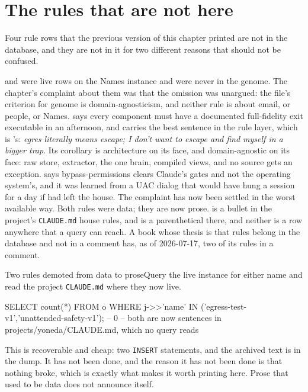 \section{The rules that are not here}

Four rule rows that the previous version of this chapter printed are not in the database, and they are not in it for two different reasons that should not be confused.

 and  were live rows on the Names instance and were never in the genome. The chapter's complaint about them was that the omission was unargued: the file's criterion for genome is domain-agnosticism, and neither rule is about email, or people, or Names.  says every component must have a documented full-fidelity exit executable in an afternoon, and carries the best sentence in the rule layer, which is \labPI's: \emph{egres literally means escape; I don't want to escape and find myself in a bigger trap}. Its corollary is architecture on its face, and domain-agnostic on its face: raw store, extractor, the one brain, compiled views, and no source gets an exception.  says bypass-permissions clears Claude's gates and not the operating system's, and it was learned from a UAC dialog that would have hung a session for a day if \labPI{} had left the house. The complaint has now been settled in the worst available way. Both rules were data; they are now prose.  is a bullet in the project's \texttt{CLAUDE.md} house rules, and  is a parenthetical there, and neither is a row anywhere that a query can reach. A book whose thesis is that rules belong in the database and not in a comment has, as of 2026-07-17, two of its rules in a comment.

\begin{Correspondence}{Two rules demoted from data to prose}{Query the live instance for either name and read the project \texttt{CLAUDE.md} where they now live.}
\begin{Check}
SELECT count(*) FROM o WHERE j->>'name' IN ('egress-test-v1','unattended-safety-v1');
-- 0
-- both are now sentences in projects/yoneda/CLAUDE.md, which no query reads
\end{Check}
This is recoverable and cheap: two \texttt{INSERT} statements, and the archived text is in the dump. It has not been done, and the reason it has not been done is that nothing broke, which is exactly what makes it worth printing here. Prose that used to be data does not announce itself.
\end{Correspondence}

